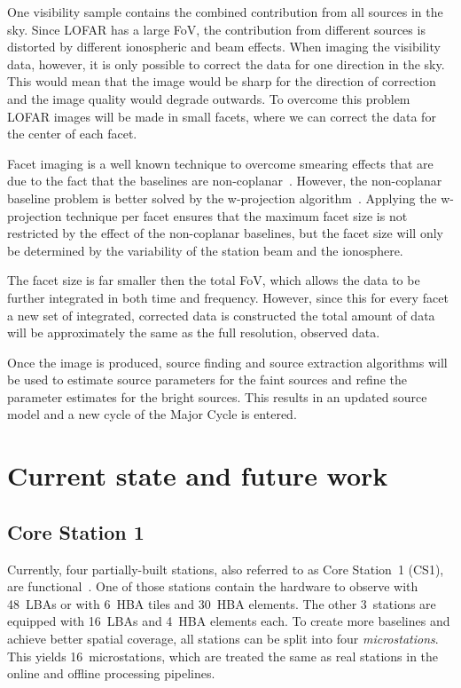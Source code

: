 \documentclass[journal]{IEEEtran}
\begin{document}
One visibility sample contains the combined contribution from all sources in the sky. Since LOFAR has a large FoV, the contribution from different sources is distorted by different ionospheric and beam effects. When imaging the visibility data, however, it is only possible to correct the data for one direction in the sky. This would mean that the image would be sharp for the direction of correction and the image quality would degrade outwards. To overcome this problem LOFAR images will be made in small facets, where we can correct the data for the center of each facet. 

Facet imaging is a well known technique to overcome smearing effects that are due to the fact that the baselines are non-coplanar~\cite{SIRAII:99}. However, the non-coplanar baseline problem is better solved by the w-projection algorithm~\cite{Cornwell:05}. Applying the w-projection technique per facet ensures that the maximum facet size is not restricted by the effect of the non-coplanar baselines, but the facet size will only be determined by the variability of the station beam and the ionosphere.

The facet size is far smaller then the total FoV, which allows the data to be further integrated in both time and frequency. However, since this for every facet a new set of integrated, corrected data is constructed the total amount of data will be approximately the same as the full resolution, observed data.
  
Once the image is produced, source finding and source extraction algorithms will be used to estimate source parameters for the faint sources and refine the parameter estimates for the bright sources. This results in an updated source model and a new cycle of the Major Cycle is entered. 

\section{Current state and future work}

\subsection{Core Station 1}
Currently, four partially-built stations, also referred to as Core Station~1
(CS1), are functional~\cite{gunst:06}.
One of those stations contain the hardware to observe with 48~LBAs or with
6~HBA tiles and 30~HBA elements.
The other 3~stations are equipped with 16~LBAs and 4~HBA elements each.
To create more baselines and achieve better spatial coverage, all stations
can be split into four {\em microstations}.
This yields 16~microstations, which are treated the same as real stations in
the online and offline processing pipelines.
\end{document}
